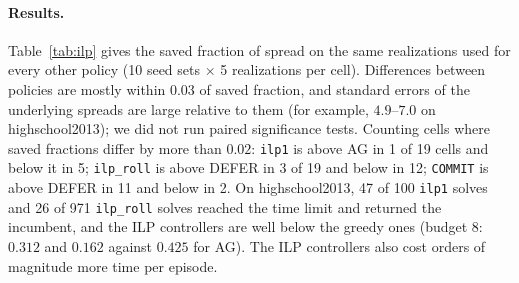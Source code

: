 \documentclass[ijoc,sglanonrev]{informs4}
\begin{document}
\paragraph{Results.} Table~\ref{tab:ilp} gives the saved fraction of spread on
the same realizations used for every other policy (10 seed sets $\times$ 5
realizations per cell). Differences between policies are mostly within $0.03$
of saved fraction, and standard errors of the underlying spreads are large
relative to them (for example, $4.9$--$7.0$ on highschool2013); we did not run
paired significance tests. Counting cells where saved fractions differ by more than $0.02$:
\texttt{ilp1} is above AG in 1 of 19 cells and below it in 5; \texttt{ilp\_roll}
is above DEFER in 3 of 19 and below in 12; \texttt{COMMIT} is above DEFER in 11
and below in 2. On highschool2013, 47 of 100 \texttt{ilp1} solves and 26 of 971
\texttt{ilp\_roll} solves reached the time limit and returned the incumbent, and
the ILP controllers are well below the greedy ones (budget $8$: $0.312$ and
$0.162$ against $0.425$ for AG). The ILP controllers also cost orders of
magnitude more time per episode.
\end{document}
